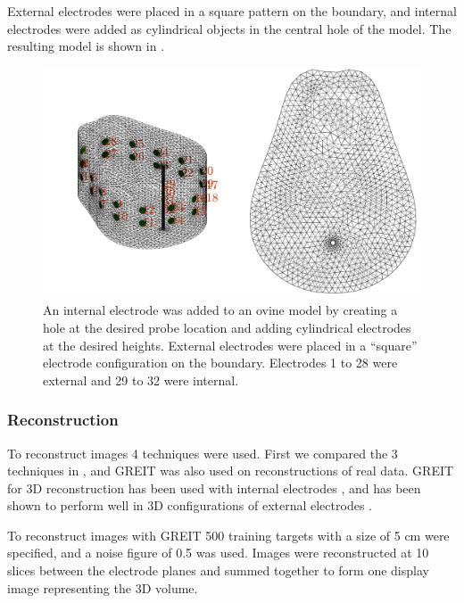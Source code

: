External electrodes were placed in a square pattern on the boundary, and internal
electrodes were added as cylindrical objects in the central hole of the model.
The resulting model is shown in .

\begin{figure}[H]
    \centering
	\includegraphics[width=\textwidth]{chapter7-internal_elec_motion/imgs/lamb_model.pdf} 
	\caption[Ovine model with internal probe]{\label{fig:internal_lamb_model} 
	An internal electrode was added to an ovine model by creating a hole at the desired probe
	location and adding cylindrical electrodes at the desired heights. External electrodes
	were placed in a ``square'' electrode configuration on the boundary. Electrodes 1 to 28 were 
	external and 29 to 32 were internal.}
\end{figure}

\subsubsection{Reconstruction}
To reconstruct images 4 techniques were used. First we compared the 3
techniques in , and GREIT was also used on reconstructions 
of real data.
GREIT for 3D reconstruction has been used with internal electrodes 
\parencite{nasehi_tehrani_evaluation_2012,nasehi_tehrani_modelling_2012}, 
and has been shown to perform well in 3D configurations of external electrodes
\parencite{grychtol_3d_2016}.

To reconstruct images with GREIT 500 training targets with a size of 5 cm were specified, and a noise figure
of 0.5 was used.
Images were reconstructed at 10 slices between the electrode planes and summed together to form one 
display image representing the 3D volume.

